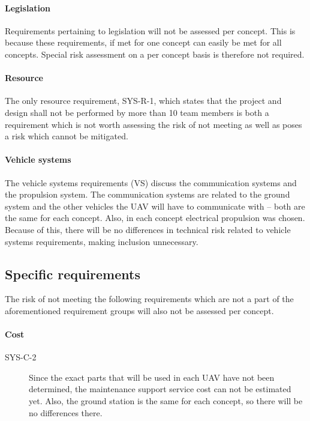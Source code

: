 \paragraph{Legislation}
Requirements pertaining to legislation will not be assessed per concept. This is because these requirements, if met for one concept can easily be met for all concepts. Special risk assessment on a per concept basis is therefore not required.

\paragraph{Resource}
The only resource requirement, SYS-R-1, which states that the project and design shall not be performed by more than 10 team members is both a requirement which is not worth assessing the risk of not meeting as well as poses a risk which cannot be mitigated.

\paragraph{Vehicle systems}
The vehicle systems requirements (VS) discuss the communication systems and the propulsion system. The communication systems are related to the ground system and the other vehicles the UAV will have to communicate with -- both are the same for each concept. Also, in each concept electrical propulsion was chosen. Because of this, there will be no differences in technical risk related to vehicle systems requirements, making inclusion unnecessary.


\subsection{Specific requirements}
The risk of not meeting the following requirements which are not a part of the aforementioned requirement groups will also not be assessed per concept. 

\paragraph{Cost}

\begin{description}
    \item[SYS-C-2] Since the exact parts that will be used in each UAV have not been determined, the maintenance support service cost can not be estimated yet. Also, the ground station is the same for each concept, so there will be no differences there.
\end{description}


